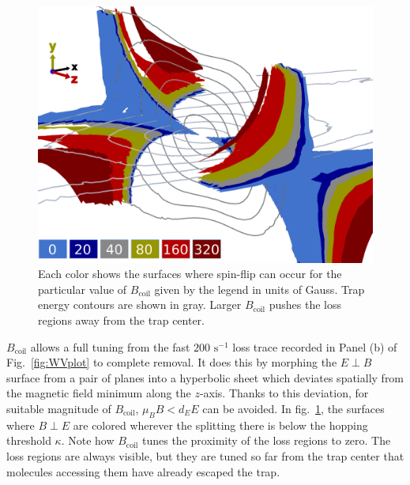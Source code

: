 \documentclass[%
 reprint,
groupedaddress,
 amsmath,amssymb,
 aps,
prl,
]{revtex4-1}
\newcommand{\epb}{$E\!\perp\!B$}
\begin{document}
\begin{figure}[tb]
\includegraphics[width=\linewidth]{LossSurfaces/Loss_Surface_Chunks_recolored_legend.png}%
\caption{
Each color shows the surfaces where spin-flip can occur for the particular value of $B_\text{coil}$ given by the legend in units of Gauss. Trap energy contours are shown in gray. Larger $B_\text{coil}$ pushes the loss regions away from the trap center.
\label{fig:LSurfs}}
\end{figure}

$B_\text{coil}$ allows a full tuning from the fast $200\text{ s}^{-1}$ loss trace recorded in Panel (b) of Fig.~\ref{fig:WVplot} to complete removal. It does this by morphing the \epb surface from a pair of planes into a hyperbolic sheet which deviates spatially from the magnetic field minimum along the $z$-axis. Thanks to this deviation, for suitable magnitude of $B_\text{coil}$, $\mu_BB< d_EE$ can be avoided. In fig.~\ref{fig:LSurfs}, the surfaces where $B\!\perp\! E$ are colored wherever the splitting there is below the hopping threshold $\kappa$. Note how $B_\text{coil}$ tunes the proximity of the loss regions to zero. The loss regions are always visible, but they are tuned so far from the trap center that molecules accessing them have already escaped the trap.
\end{document}
